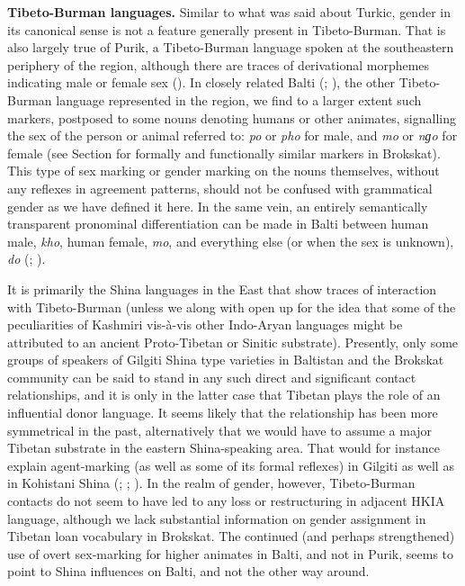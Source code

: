 \documentclass[output=collectionpaper]{langsci/langscibook}
\begin{document}
\textbf{Tibeto-Burman languages.} Similar to what was said about Turkic, gender in its canonical sense is not a feature generally present in Tibeto-Burman. That is also largely true of Purik, a Tibeto-Burman language spoken at the southeastern periphery of the region, although there are traces of derivational morphemes indicating male or female sex (\citealt[118--127]{Zemp2013}). In closely related Balti (\citealt[81]{Bielmeier1985}; \citealt[4]{Read1934}), the other Tibeto-Burman language represented in the region, we find to a larger extent such markers, postposed to some nouns denoting humans or other animates, signalling the sex of the person or animal referred to: \textit{po} or \textit{pho} for male, and \textit{mo} or \textit{nɡ}\textit{o} for female (see Section  for formally and functionally similar markers in Brokskat). This type of sex marking or gender marking on the nouns themselves, without any reflexes in agreement patterns, should not be confused with grammatical gender as we have defined it here. In the same vein, an entirely semantically transparent pronominal differentiation can be made in Balti between human male, \textit{kho}, human female, \textit{mo}, and everything else (or when the sex is unknown), \textit{do} (\citealt[12--13]{Read1934}; \citealt[76]{Bielmeier1985}).

It is primarily the Shina languages in the East that show traces of interaction with Tibeto-Burman (unless we along with \citet[305]{Tikkanen1988} open up for the idea that some of the peculiarities of Kashmiri vis-à-vis other Indo-Aryan languages might be attributed to an ancient Proto-Tibetan or Sinitic substrate). Presently, only some groups of speakers of Gilgiti Shina type varieties in Baltistan and the Brokskat community can be said to stand in any such direct and significant contact relationships, and it is only in the latter case that Tibetan plays the role of an influential donor language. It seems likely that the relationship has been more symmetrical in the past, alternatively that we would have to assume a major Tibetan substrate in the eastern Shina-speaking area. That would for instance explain agent-marking (as well as some of its formal reflexes) in Gilgiti as well as in Kohistani Shina (\citealt[162--163]{Liljegren2014}; \citealt[211]{Bailey1924}; \citealt[213--214]{Hook2004}). In the realm of gender, however, Tibeto-Burman contacts do not seem to have led to any loss or restructuring in adjacent HKIA language, although we lack substantial information on gender assignment in Tibetan loan vocabulary in Brokskat. The continued (and perhaps strengthened) use of overt sex-marking for higher animates in Balti, and not in Purik, seems to point to Shina influences on Balti, and not the other way around.
\end{document}
